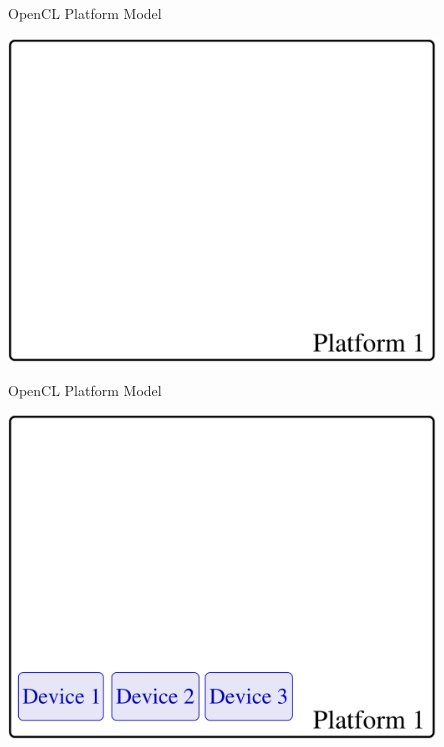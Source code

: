 




\begin{frame}{OpenCL Platform Model}
 \begin{center}
   \includegraphics[width=0.85\textwidth]{figs/opencl-2.pdf}
 \end{center}
\end{frame}

\begin{frame}{OpenCL Platform Model}
 \begin{center}
   \includegraphics[width=0.85\textwidth]{figs/opencl-3.pdf}
 \end{center}
\end{frame}

